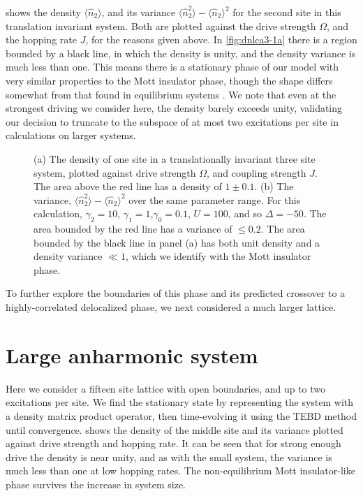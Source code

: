 shows the density \(\langle \hat{n}_{2} \rangle\), and its variance \(\langle \hat{n}_{2}^{2} \rangle - \langle \hat{n}_{2} \rangle^{2}\) for the second site in this translation invariant system. Both are plotted against the drive strength \(\Omega\), and the hopping rate \(J\), for the reasons given above. In \cref{fig:dnlca3-1a} there is a region bounded by a black line, in which the density is unity, and the density variance is much less than one. This means there is a stationary phase of our model with very similar properties to the Mott insulator phase, though the shape differs somewhat from that found in equilibrium systems \cite{Rossini2007}. We note that even at the strongest driving we consider here, the density barely exceeds unity, validating our decision to truncate to the subspace of at most two excitations per site in calculations on larger systems.

\begin{figure}[ht]
	 \hfill
	\caption{\label{fig:dnlca3-1} (a) The density of one site in a translationally invariant three site system, plotted against drive strength \(\Omega\), and coupling strength \(J\). The area above the red line has a density of \(1 \pm 0.1\). (b) The variance, \(\langle \hat{n}_{2}^{2} \rangle - \langle \hat{n}_{2} \rangle^{2}\) over the same parameter range. For this calculation, \(\gamma_{2} = 10\), \(\gamma_{1} = 1\),\(\gamma_{0} = 0.1\), \(U=100\), and so \(\Delta = -50\). The area bounded by the red line has a variance of \(\leq 0.2\). The area bounded by the black line in panel (a) has both unit density and a density variance \(\ll 1\), which we identify with the Mott insulator phase.}
\end{figure}

To further explore the boundaries of this phase and its predicted crossover to a highly-correlated delocalized phase, we next considered a much larger lattice.

\section{Large anharmonic system}

Here we consider a fifteen site lattice with open boundaries, and up to two excitations per site. We find the stationary state by representing the system with a density matrix product operator, then time-evolving it using the TEBD method \cite{Vidal2004} until convergence.  shows the density of the middle site and its variance plotted against drive strength and hopping rate. It can be seen that for strong enough drive the density is near unity, and as with the small system, the variance is much less than one at low hopping rates. The non-equilibrium Mott insulator-like phase survives the increase in system size.

